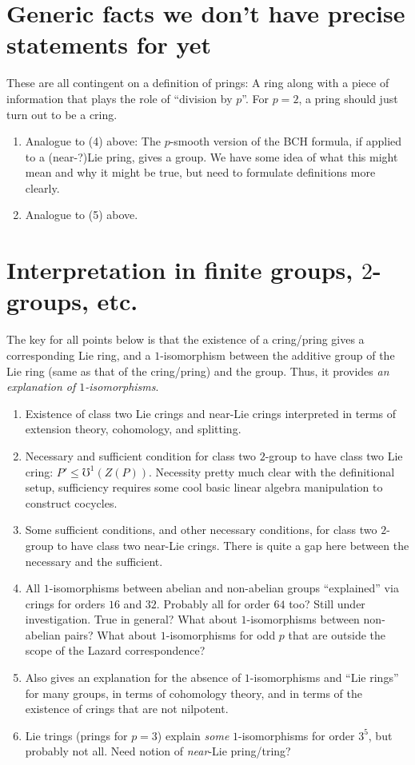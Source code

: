 \documentclass[10pt]{amsart}
\begin{document}
\section*{Generic facts we don't have precise statements for yet}

These are all contingent on a definition of prings: A ring along with
a piece of information that plays the role of ``division by $p$''. For
$p = 2$, a pring should just turn out to be a cring. 

\begin{enumerate}
\item Analogue to (4) above: The $p$-smooth version of the BCH formula,
  if applied to a (near-?)Lie pring, gives a group. We have some idea
  of what this might mean and why it might be true, but need to
  formulate definitions more clearly.
\item Analogue to (5) above.
\end{enumerate}

\section*{Interpretation in finite groups, $2$-groups, etc.}

The key for all points below is that the existence of a cring/pring
gives a corresponding Lie ring, and a $1$-isomorphism between the
additive group of the Lie ring (same as that of the cring/pring) and
the group. Thus, it provides {\em an explanation of $1$-isomorphisms}.
\begin{enumerate}
\item Existence of class two Lie crings and near-Lie crings
  interpreted in terms of extension theory, cohomology, and splitting.
\item Necessary and sufficient condition for class two $2$-group to
  have class two Lie cring: $P' \le \mho^1(Z(P))$. Necessity pretty
  much clear with the definitional setup, sufficiency requires some
  cool basic linear algebra manipulation to construct cocycles.
\item Some sufficient conditions, and other necessary conditions, for
  class two $2$-group to have class two near-Lie crings. There is
  quite a gap here between the necessary and the sufficient.
\item All $1$-isomorphisms between abelian and non-abelian groups
  ``explained'' via crings for orders $16$ and $32$. Probably all for
  order $64$ too? Still under investigation. True in general? What
  about $1$-isomorphisms between non-abelian pairs? What about
  $1$-isomorphisms for odd $p$ that are outside the scope of the
  Lazard correspondence?
\item Also gives an explanation for the absence of $1$-isomorphisms
  and ``Lie rings'' for many groups, in terms of cohomology theory,
  and in terms of the existence of crings that are not nilpotent.
\item Lie trings (prings for $p = 3$) explain {\em some}
  $1$-isomorphisms for order $3^5$, but probably not all. Need notion
  of {\em near}-Lie pring/tring?
\end{enumerate}
\end{document}
